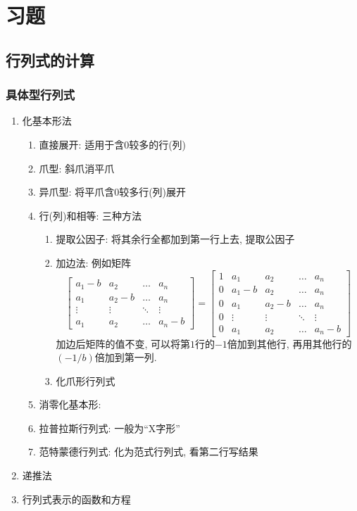 \section{习题}
\subsection{行列式的计算}
\subsubsection{具体型行列式}
\begin{enumerate}
	\item 化基本形法
	\begin{enumerate}
		\item 直接展开: 适用于含$ 0 $较多的行(列)
		\item 爪型: 斜爪消平爪
		\item 异爪型: 将平爪含$ 0 $较多行(列)展开
		\item 行(列)和相等: 三种方法
		\begin{enumerate}
			\item 提取公因子: 将其余行全都加到第一行上去, 提取公因子
			\item 加边法: 例如矩阵
			\begin{equation*}
				\begin{bmatrix}
					a_{1}-b & a_{2} & \dots & a_{n} \\
					a_{1} & a_{2}-b & \dots & a_{n} \\
					\vdots & \vdots & \ddots & \vdots \\
					a_{1} & a_{2} & \dots & a_{n}-b
				\end{bmatrix}=
			    \begin{bmatrix}
			    	1 & a_{1} & a_{2} & \dots & a_{n} \\
			    	0 & a_{1}-b & a_{2} & \dots & a_{n} \\
			    	0 & a_{1} & a_{2}-b & \dots & a_{n} \\
			    	0 & \vdots & \vdots & \ddots & \vdots \\
			    	0 & a_{1} & a_{2} & \dots & a_{n}-b
			    \end{bmatrix}
			\end{equation*}加边后矩阵的值不变, 可以将第$ 1 $行的$ -1 $倍加到其他行, 再用其他行的$ (-1/b) $倍加到第一列.
		    \item 化爪形行列式
		\end{enumerate}
		\item 消零化基本形: 
		\item 拉普拉斯行列式: 一般为``X字形''
		\item 范特蒙德行列式: 化为范式行列式, 看第二行写结果
	\end{enumerate}
	\item 递推法
	\item 行列式表示的函数和方程
\end{enumerate}
